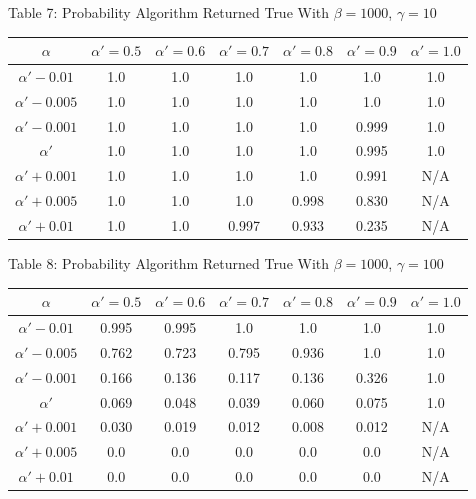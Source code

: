 \documentclass{article}
\begin{document}
\begin{center}
Table 7: Probability Algorithm Returned True With $\beta=1000$, $\gamma=10$ \\
\begin{tabular}{|c|c|c|c|c|c|c|}
\hline
$\alpha$ & $\alpha' = 0.5$ & $\alpha' = 0.6$ & $\alpha' = 0.7$ & $\alpha' = 0.8$ & $\alpha' = 0.9$ & $\alpha' = 1.0$ \\
\hline
$\alpha' -0.01$ & 1.0 & 1.0 & 1.0 & 1.0 & 1.0 & 1.0 \\
\hline
$\alpha'-0.005$ & 1.0 & 1.0 & 1.0 & 1.0 & 1.0 & 1.0 \\
\hline
$\alpha'-0.001$ & 1.0 & 1.0 & 1.0 & 1.0 & 0.999 & 1.0 \\
\hline
$\alpha'$            & 1.0 & 1.0 & 1.0 & 1.0 & 0.995 & 1.0 \\
\hline
$\alpha'+0.001$ & 1.0 & 1.0 & 1.0 & 1.0 & 0.991 & N/A \\
\hline
$\alpha'+0.005$ & 1.0 & 1.0 & 1.0 & 0.998 & 0.830 & N/A \\
\hline
$\alpha'+0.01 $ & 1.0 & 1.0 & 0.997 & 0.933 & 0.235 & N/A \\
\hline
\end{tabular}
\end{center}

\begin{center}
Table 8: Probability Algorithm Returned True With $\beta=1000$, $\gamma=100$ \\
\begin{tabular}{|c|c|c|c|c|c|c|}
\hline
$\alpha$ & $\alpha' = 0.5$ & $\alpha' = 0.6$ & $\alpha' = 0.7$ & $\alpha' = 0.8$ & $\alpha' = 0.9$ & $\alpha' = 1.0$ \\
\hline
$\alpha' -0.01$ & 0.995 & 0.995 & 1.0 & 1.0 & 1.0 & 1.0 \\
\hline
$\alpha'-0.005$ & 0.762 & 0.723 & 0.795 & 0.936 & 1.0 & 1.0 \\
\hline
$\alpha'-0.001$ & 0.166 & 0.136 & 0.117 & 0.136 & 0.326 & 1.0 \\
\hline
$\alpha'$            & 0.069 & 0.048 & 0.039 & 0.060 & 0.075 & 1.0 \\
\hline
$\alpha'+0.001$ & 0.030 & 0.019 & 0.012 & 0.008 & 0.012 & N/A \\
\hline
$\alpha'+0.005$ & 0.0 & 0.0 & 0.0 & 0.0 & 0.0 & N/A \\
\hline
$\alpha'+0.01 $ & 0.0 & 0.0 & 0.0 & 0.0 & 0.0 & N/A \\
\hline
\end{tabular}
\end{center}
\end{document}
